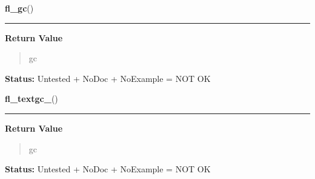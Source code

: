     \label{xformslib:library:fl_gc_}

    \vspace{0.5ex}

\hspace{.8\funcindent}\begin{boxedminipage}{\funcwidth}

    \raggedright \textbf{fl\_gc}()

    \vspace{-1.5ex}

    \rule{\textwidth}{0.5\fboxrule}
\setlength{\parskip}{2ex}
\setlength{\parskip}{1ex}
      \textbf{Return Value}
    \vspace{-1ex}

      \begin{quote}
      gc

      \end{quote}

\textbf{Status:} Untested + NoDoc + NoExample = NOT OK



    \end{boxedminipage}

    \label{xformslib:library:fl_textgc_}

    \vspace{0.5ex}

\hspace{.8\funcindent}\begin{boxedminipage}{\funcwidth}

    \raggedright \textbf{fl\_textgc\_}()

    \vspace{-1.5ex}

    \rule{\textwidth}{0.5\fboxrule}
\setlength{\parskip}{2ex}
\setlength{\parskip}{1ex}
      \textbf{Return Value}
    \vspace{-1ex}

      \begin{quote}
      gc

      \end{quote}

\textbf{Status:} Untested + NoDoc + NoExample = NOT OK



    \end{boxedminipage}

